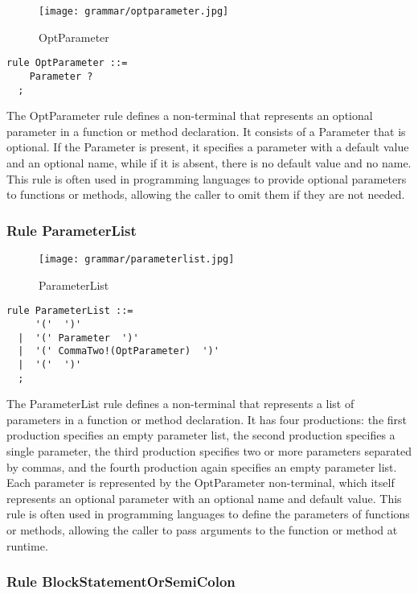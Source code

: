 \begin{figure}[!ht]
\centering
\texttt{[image: grammar/optparameter.jpg]}
\caption{OptParameter}
\end{figure}

\begin{lstlisting}
rule OptParameter ::=
    Parameter ?  
  ;
\end{lstlisting}

The OptParameter rule defines a non-terminal that represents an optional parameter in a function or method declaration. It consists of a Parameter that is optional. If the Parameter is present, it specifies a parameter with a default value and an optional name, while if it is absent, there is no default value and no name. This rule is often used in programming languages to provide optional parameters to functions or methods, allowing the caller to omit them if they are not needed.

\subsubsection*{Rule ParameterList}

\begin{figure}[!ht]
\centering
\texttt{[image: grammar/parameterlist.jpg]}
\caption{ParameterList}
\end{figure}

\begin{lstlisting}
rule ParameterList ::=
     '('  ')' 
  |  '(' Parameter  ')' 
  |  '(' CommaTwo!(OptParameter)  ')' 
  |  '('  ')' 
  ;
\end{lstlisting}

The ParameterList rule defines a non-terminal that represents a list of parameters in a function or method declaration. It has four productions: the first production specifies an empty parameter list, the second production specifies a single parameter, the third production specifies two or more parameters separated by commas, and the fourth production again specifies an empty parameter list. Each parameter is represented by the OptParameter non-terminal, which itself represents an optional parameter with an optional name and default value. This rule is often used in programming languages to define the parameters of functions or methods, allowing the caller to pass arguments to the function or method at runtime.

\subsubsection*{Rule BlockStatementOrSemiColon}

